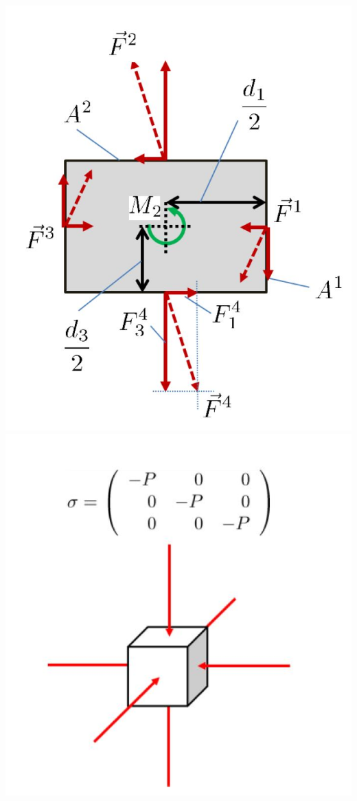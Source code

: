		\includegraphics[scale=.3]{images/3Dangularmomentum}				
		\includegraphics[scale=.3]{images/3Dcfisotropic}				
